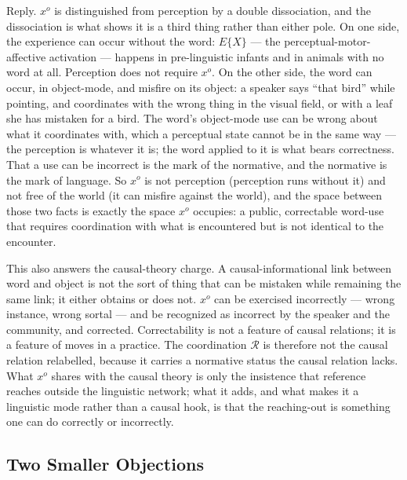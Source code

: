 \documentclass[12pt,a4paper]{article}
\begin{document}
Reply. \(x^o\) is distinguished from perception by a double dissociation, and the dissociation is what shows it is a third thing rather than either pole. On one side, the experience can occur without the word: \(E\{X\}\) --- the perceptual-motor-affective activation --- happens in pre-linguistic infants and in animals with no word at all. Perception does not require \(x^o\). On the other side, the word can occur, in object-mode, and misfire on its object: a speaker says ``that bird'' while pointing, and coordinates with the wrong thing in the visual field, or with a leaf she has mistaken for a bird. The word's object-mode use can be wrong about what it coordinates with, which a perceptual state cannot be in the same way --- the perception is whatever it is; the word applied to it is what bears correctness. That a use can be incorrect is the mark of the normative, and the normative is the mark of language. So \(x^o\) is not perception (perception runs without it) and not free of the world (it can misfire against the world), and the space between those two facts is exactly the space \(x^o\) occupies: a public, correctable word-use that requires coordination with what is encountered but is not identical to the encounter.

This also answers the causal-theory charge. A causal-informational link between word and object is not the sort of thing that can be mistaken while remaining the same link; it either obtains or does not. \(x^o\) can be exercised incorrectly --- wrong instance, wrong sortal --- and be recognized as incorrect by the speaker and the community, and corrected. Correctability is not a feature of causal relations; it is a feature of moves in a practice. The coordination \(\mathcal{R}\) is therefore not the causal relation relabelled, because it carries a normative status the causal relation lacks. What \(x^o\) shares with the causal theory is only the insistence that reference reaches outside the linguistic network; what it adds, and what makes it a linguistic mode rather than a causal hook, is that the reaching-out is something one can do correctly or incorrectly.

\subsection{Two Smaller Objections}\label{two-smaller-objections}
\end{document}
